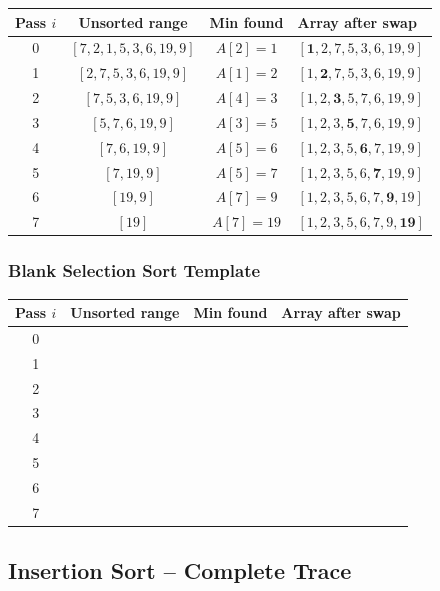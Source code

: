 \documentclass[12pt,portrait]{article}
\begin{document}
\begin{center}
\begin{tabular}{c|c|c|l}
\toprule
\textbf{Pass $i$} & \textbf{Unsorted range} & \textbf{Min found} & \textbf{Array after swap} \\
\midrule
0 & $[7,2,1,5,3,6,19,9]$ & $A[2]=1$ & $[\mathbf{1},2,7,5,3,6,19,9]$ \\
1 & $[2,7,5,3,6,19,9]$ & $A[1]=2$ & $[1,\mathbf{2},7,5,3,6,19,9]$ \\
2 & $[7,5,3,6,19,9]$ & $A[4]=3$ & $[1,2,\mathbf{3},5,7,6,19,9]$ \\
3 & $[5,7,6,19,9]$ & $A[3]=5$ & $[1,2,3,\mathbf{5},7,6,19,9]$ \\
4 & $[7,6,19,9]$ & $A[5]=6$ & $[1,2,3,5,\mathbf{6},7,19,9]$ \\
5 & $[7,19,9]$ & $A[5]=7$ & $[1,2,3,5,6,\mathbf{7},19,9]$ \\
6 & $[19,9]$ & $A[7]=9$ & $[1,2,3,5,6,7,\mathbf{9},19]$ \\
7 & $[19]$ & $A[7]=19$ & $[1,2,3,5,6,7,9,\mathbf{19}]$ \\
\bottomrule
\end{tabular}
\end{center}

\subsubsection{Blank Selection Sort Template}

\begin{center}
\begin{tabular}{c|c|c|l}
\toprule
\textbf{Pass $i$} & \textbf{Unsorted range} & \textbf{Min found} & \textbf{Array after swap} \\
\midrule
0 & & & \\
1 & & & \\
2 & & & \\
3 & & & \\
4 & & & \\
5 & & & \\
6 & & & \\
7 & & & \\
\bottomrule
\end{tabular}
\end{center}

\subsection{Insertion Sort -- Complete Trace}
\end{document}
